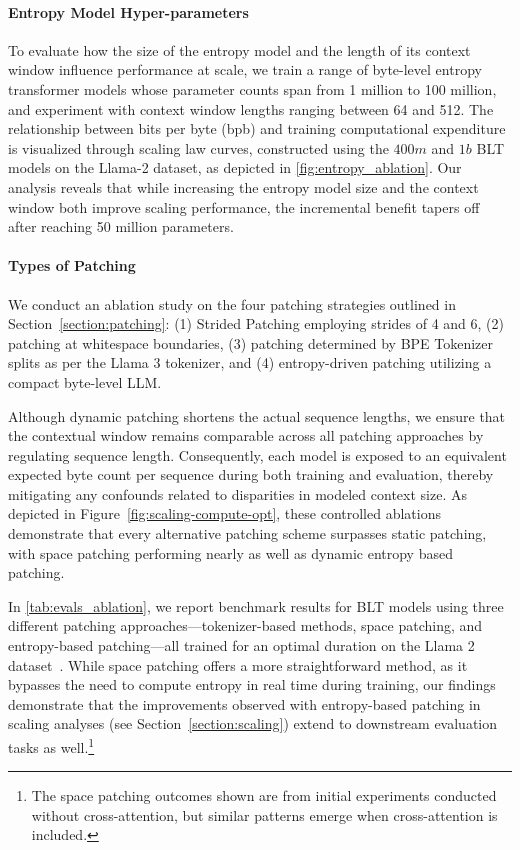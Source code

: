 \paragraph{Entropy Model Hyper-parameters} To evaluate how the size of the entropy model and the length of its context window influence performance at scale, we train a range of byte-level entropy transformer models whose parameter counts span from 1 million to 100 million, and experiment with context window lengths ranging between 64 and 512. The relationship between bits per byte (bpb) and training computational expenditure is visualized through scaling law curves, constructed using the $400m$ and $1b$ {\textsc BLT} models on the Llama-2 dataset, as depicted in \autoref{fig:entropy_ablation}. Our analysis reveals that while increasing the entropy model size and the context window both improve scaling performance, the incremental benefit tapers off after reaching 50 million parameters.

\paragraph{Types of Patching}

We conduct an ablation study on the four patching strategies outlined in Section~\ref{section:patching}: (1) Strided Patching employing strides of 4 and 6, (2) patching at whitespace boundaries, (3) patching determined by BPE Tokenizer splits as per the Llama 3 tokenizer, and (4) entropy-driven patching utilizing a compact byte-level LLM.

Although dynamic patching shortens the actual sequence lengths, we ensure that the contextual window remains comparable across all patching approaches by regulating sequence length. Consequently, each model is exposed to an equivalent expected byte count per sequence during both training and evaluation, thereby mitigating any confounds related to disparities in modeled context size. As depicted in Figure~\ref{fig:scaling-compute-opt}, these controlled ablations demonstrate that every alternative patching scheme surpasses static patching, with space patching performing nearly as well as dynamic entropy based patching.

In \autoref{tab:evals_ablation}, we report benchmark results for {\textsc BLT} models using three different patching approaches—tokenizer-based methods, space patching, and entropy-based patching—all trained for an optimal duration on the Llama 2 dataset~\citep{dubey2024llama}. While space patching offers a more straightforward method, as it bypasses the need to compute entropy in real time during training, our findings demonstrate that the improvements observed with entropy-based patching in scaling analyses (see Section~\ref{section:scaling}) extend to downstream evaluation tasks as well.\footnote{The space patching outcomes shown are from initial experiments conducted without cross-attention, but similar patterns emerge when cross-attention is included.}

